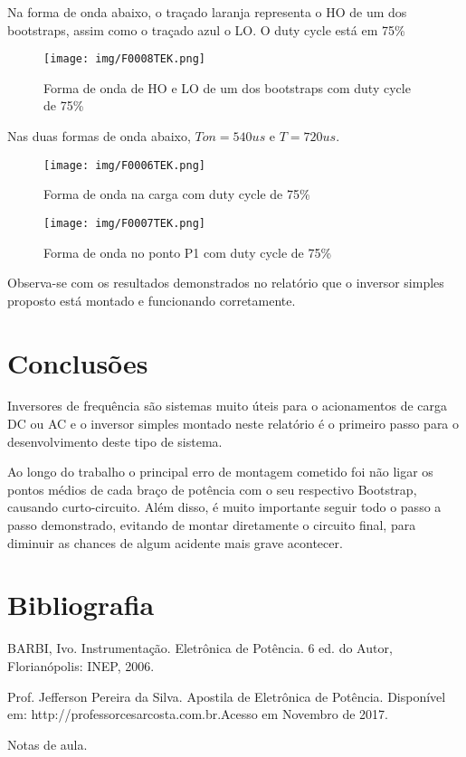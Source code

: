 \documentclass[journal, a4paper]{IEEEtran}
\begin{document}
Na forma de onda abaixo, o traçado laranja representa o HO de um dos bootstraps, assim como o traçado azul o LO. O duty cycle está em 75\%

\begin{figure}[H]\begin{center}
	\texttt{[image: img/F0008TEK.png]} 
	\caption{Forma de onda de HO e LO de um dos bootstraps com duty cycle de 75\%}   
	\label{fig:tf_p}
\end{center}\end{figure}

Nas duas formas de onda abaixo, $Ton = 540us $ e $T = 720us$.

\begin{figure}[H]\begin{center}
	\texttt{[image: img/F0006TEK.png]} 
	\caption{Forma de onda na carga com duty cycle de 75\%}   
	\label{fig:tf_p}
\end{center}\end{figure}

\begin{figure}[H]\begin{center}
	\texttt{[image: img/F0007TEK.png]} 
	\caption{Forma de onda no ponto P1 com duty cycle de 75\%}   
	\label{fig:tf_p}
\end{center}\end{figure}

Observa-se com os resultados demonstrados no relatório que o inversor simples proposto está montado e funcionando corretamente.


\section{Conclusões}

Inversores de frequência são sistemas muito úteis para o acionamentos de carga DC ou AC e o inversor simples montado neste relatório é o primeiro passo para o desenvolvimento deste tipo de sistema.

Ao longo do trabalho o principal erro de montagem cometido foi não ligar os pontos médios de cada braço de potência com o seu respectivo Bootstrap, causando curto-circuito. Além disso, é muito importante seguir todo o passo a passo demonstrado, evitando de montar diretamente o circuito final, para diminuir as chances de algum acidente mais grave acontecer.

\section{Bibliografia}

BARBI, Ivo. Instrumentação. Eletrônica de Potência. 6 ed. do Autor, Florianópolis: INEP, 2006.

Prof. Jefferson Pereira da Silva. Apostila de Eletrônica de Potência. Disponível em:
http://professorcesarcosta.com.br.Acesso em Novembro de 2017.

Notas de aula.
\end{document}
